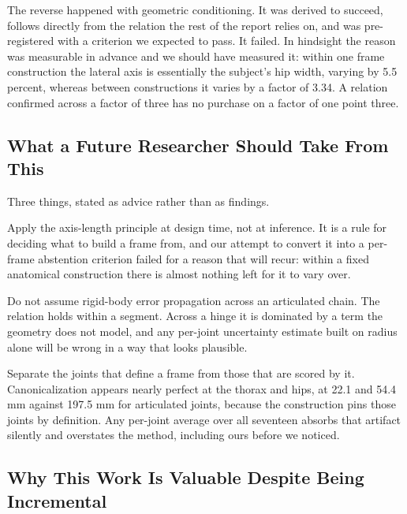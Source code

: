 \documentclass[12pt,a4paper]{report}
\begin{document}
The reverse happened with geometric conditioning. It was derived to succeed, follows directly from the relation the rest of the report relies on, and was pre-registered with a criterion we expected to pass. It failed. In hindsight the reason was measurable in advance and we should have measured it: within one frame construction the lateral axis is essentially the subject's hip width, varying by 5.5 percent, whereas between constructions it varies by a factor of 3.34. A relation confirmed across a factor of three has no purchase on a factor of one point three.

\subsection*{What a Future Researcher Should Take From This}

Three things, stated as advice rather than as findings.

Apply the axis-length principle at design time, not at inference. It is a rule for deciding what to build a frame from, and our attempt to convert it into a per-frame abstention criterion failed for a reason that will recur: within a fixed anatomical construction there is almost nothing left for it to vary over.

Do not assume rigid-body error propagation across an articulated chain. The relation holds within a segment. Across a hinge it is dominated by a term the geometry does not model, and any per-joint uncertainty estimate built on radius alone will be wrong in a way that looks plausible.

Separate the joints that define a frame from those that are scored by it. Canonicalization appears nearly perfect at the thorax and hips, at 22.1 and 54.4 mm against 197.5 mm for articulated joints, because the construction pins those joints by definition. Any per-joint average over all seventeen absorbs that artifact silently and overstates the method, including ours before we noticed.

\subsection*{Why This Work Is Valuable Despite Being Incremental}
\end{document}
